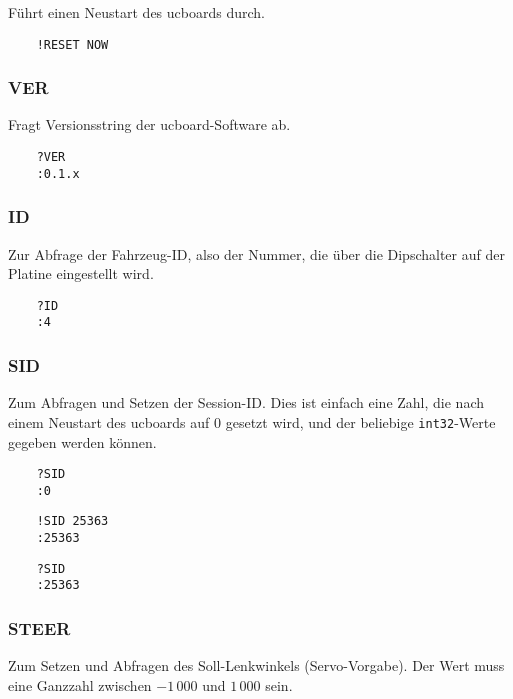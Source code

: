 Führt einen Neustart des ucboards durch.


\begin{verbatim}
	!RESET NOW
\end{verbatim}



\subsubsection{VER}

Fragt Versionsstring der ucboard-Software ab.


\begin{verbatim}
	?VER
	:0.1.x
\end{verbatim}



\subsubsection{ID}

Zur Abfrage der Fahrzeug-ID, also der Nummer, die über die Dipschalter auf der Platine eingestellt wird.


\begin{verbatim}
	?ID
	:4
\end{verbatim}


\subsubsection{SID}

Zum Abfragen und Setzen der Session-ID. Dies ist einfach eine Zahl, die nach einem Neustart des ucboards auf 0 gesetzt wird, und der beliebige \verb|int32|-Werte gegeben werden können.


\begin{verbatim}
	?SID
	:0
\end{verbatim}

\begin{verbatim}
	!SID 25363
	:25363
\end{verbatim}

\begin{verbatim}
	?SID
	:25363
\end{verbatim}




\subsubsection{STEER}

Zum Setzen und Abfragen des Soll-Lenkwinkels (Servo-Vorgabe). Der Wert muss eine Ganzzahl zwischen $-1\,000$ und $1\,000$ sein.

